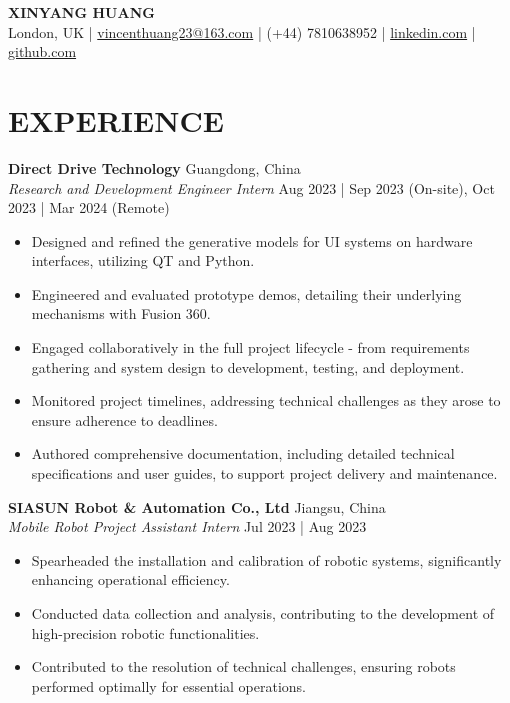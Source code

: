 \documentclass[a4paper,9pt]{extarticle}
\begin{document}
\pagestyle{empty}

\begin{center}
\textbf{\Large XINYANG HUANG}\\[2pt] 
London, UK | \href{mailto:huangxinyangapp@163.com}{vincenthuang23@163.com} | (+44) 7810638952 | \href{https://www.linkedin.com/in/xinyang-huang/}{linkedin.com} | \href{https://github.com/D1Vincenzo}{github.com} 
\end{center}


\section*{EXPERIENCE}
\noindent
\textbf{Direct Drive Technology} \hfill Guangdong, China\\ 
\textit{Research and Development Engineer Intern} \hfill Aug 2023 | Sep 2023 (On-site), Oct 2023 | Mar 2024 (Remote)
\begin{itemize}
    \item Designed and refined the generative models for UI systems on hardware interfaces, utilizing QT and Python. 
    \item Engineered and evaluated prototype demos, detailing their underlying mechanisms with Fusion 360.
    \item Engaged collaboratively in the full project lifecycle - from requirements gathering and system design to development, testing, and deployment.
    \item Monitored project timelines, addressing technical challenges as they arose to ensure adherence to deadlines.
    \item Authored comprehensive documentation, including detailed technical specifications and user guides, to support project delivery and maintenance.
\end{itemize}
\noindent
\textbf{SIASUN Robot \& Automation Co., Ltd} \hfill Jiangsu, China\\ 
\textit{Mobile Robot Project Assistant Intern} \hfill Jul 2023 | Aug 2023  
\begin{itemize}
    \item Spearheaded the installation and calibration of robotic systems, significantly enhancing operational efficiency. 
    \item Conducted data collection and analysis, contributing to the development of high-precision robotic functionalities.
    \item Contributed to the resolution of technical challenges, ensuring robots performed optimally for essential operations.
\end{itemize}
\end{document}
